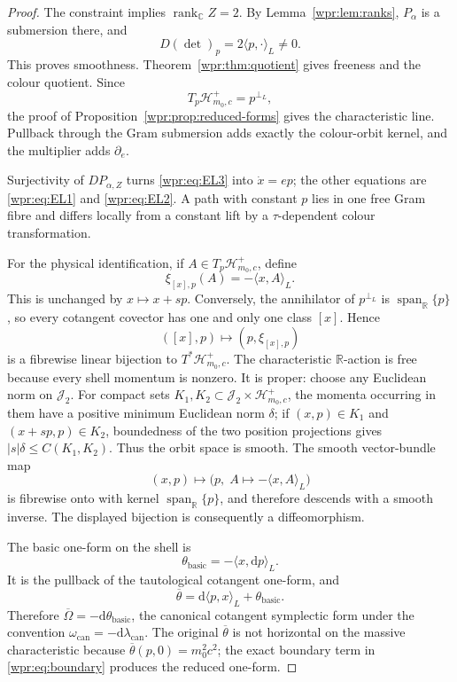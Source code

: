 \documentclass[11pt]{article}
\newcommand{\J}{\mathcal J_2}
\newcommand{\rankC}{\operatorname{rank}_{\mathbb C}}
\newcommand{\dd}{\mathrm d}
\newcommand{\SpanR}{\operatorname{span}_{\mathbb R}}
\begin{document}
\begin{proof}
The constraint implies \(\rankC Z=2\).  By
Lemma~\ref{wpr:lem:ranks}, \(P_\alpha\) is a submersion there, and
\[
 D(\det)_p=2\langle p,\mathord{\cdot}\rangle_L\neq0.
\]
This proves smoothness.  Theorem~\ref{wpr:thm:quotient} gives freeness
and the colour quotient.  Since
\[
 T_p\mathcal H^+_{m_0,c}=p^{\perp_L},
\]
the proof of Proposition~\ref{wpr:prop:reduced-forms} gives the
characteristic line.  Pullback through the Gram submersion adds exactly
the colour-orbit kernel, and the multiplier adds \(\partial_e\).

Surjectivity of \(D P_{\alpha,Z}\) turns \eqref{wpr:eq:EL3} into
\(\dot x=e p\); the other equations are \eqref{wpr:eq:EL1} and
\eqref{wpr:eq:EL2}.  A path with constant \(p\) lies in one free Gram
fibre and differs locally from a constant lift by a
\(\tau\)-dependent colour transformation.

For the physical identification, if
\(A\in T_p\mathcal H^+_{m_0,c}\), define
\[
 \xi_{[x],p}(A)=-\langle x,A\rangle_L.
\]
This is unchanged by \(x\mapsto x+s p\).  Conversely, the annihilator
of \(p^{\perp_L}\) is \(\SpanR\{p\}\), so every cotangent covector has
one and only one class \([x]\).  Hence
\[
 ([x],p)\longmapsto(p,\xi_{[x],p})
\]
is a fibrewise linear bijection to \(T^*\mathcal H^+_{m_0,c}\).
The characteristic \(\mathbb R\)-action is free because every shell
momentum is nonzero.  It is proper: choose any Euclidean norm on
\(\J\).  For compact sets \(K_1,K_2\subset
\J\times\mathcal H^+_{m_0,c}\), the momenta occurring in them have a
positive minimum Euclidean norm \(\delta\); if
\((x,p)\in K_1\) and \((x+s p,p)\in K_2\), boundedness of the two
position projections gives \(|s|\delta\leq C(K_1,K_2)\).
Thus the orbit space is smooth.  The smooth vector-bundle map
\[
 (x,p)\longmapsto
 \bigl(p,\;A\mapsto-\langle x,A\rangle_L\bigr)
\]
is fibrewise onto with kernel \(\SpanR\{p\}\), and therefore descends
with a smooth inverse.  The displayed bijection is consequently a
diffeomorphism.

The basic one-form on the shell is
\begin{equation}
 \theta_{\mathrm{basic}}=-\langle x,\dd p\rangle_L.
 \label{wpr:eq:basic}
\end{equation}
It is the pullback of the tautological cotangent one-form, and
\begin{equation}
 \overline\theta
 =\dd\langle p,x\rangle_L+\theta_{\mathrm{basic}}.
 \label{wpr:eq:boundary}
\end{equation}
Therefore
\(\overline\Omega=-\dd\theta_{\mathrm{basic}}\), the canonical
cotangent symplectic form under the convention
\(\omega_{\mathrm{can}}=-\dd\lambda_{\mathrm{can}}\).
The original \(\overline\theta\) is not horizontal on the massive
characteristic because \(\overline\theta(p,0)=m_0^2c^2\); the exact
boundary term in \eqref{wpr:eq:boundary} produces the reduced
one-form.


\end{proof}
\end{document}
